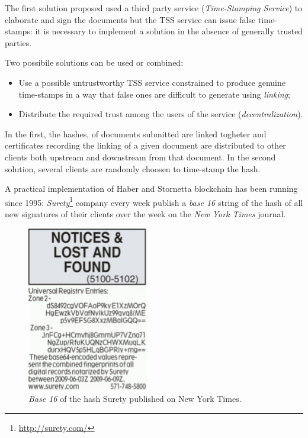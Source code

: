 The first solution proposed used a third party service (\textit{Time-Stamping Service}) to elaborate and sign the documents but the TSS service can issue false time-stamps: it is necessary to implement a solution in the absence of generally trusted parties.

Two possibile solutions can be used or combined:

\begin{itemize}
    \item Use a possible untrustworthy TSS service constrained to produce genuine time-stamps in a way that false ones are difficult to generate using \textit{linking};
    \item Distribute the required trust among the users of the service (\textit{decentralization}).
\end{itemize}

In the first, the hashes, of documents submitted are linked togheter and certificates recording the linking of a given document are distributed to other clients both upstream and downstream from that document.\newline
In the second solution, several clients are randomly choosen to time-stamp the hash.

A practical implementation of Haber and Stornetta blockchain has been running since 1995: \textit{Surety}\footnote{\url{http://surety.com/}} company every week publish a \textit{base 16} string of the hash of all new signatures of their clients over the week on the \textit{New York Times} journal.\\

\begin{figure}[!h]
    \centering
    \includegraphics[scale=0.5]{images/nyt.jpg}
    \caption{\textit{Base 16} of the hash Surety published on New York Times.}
\end{figure}

